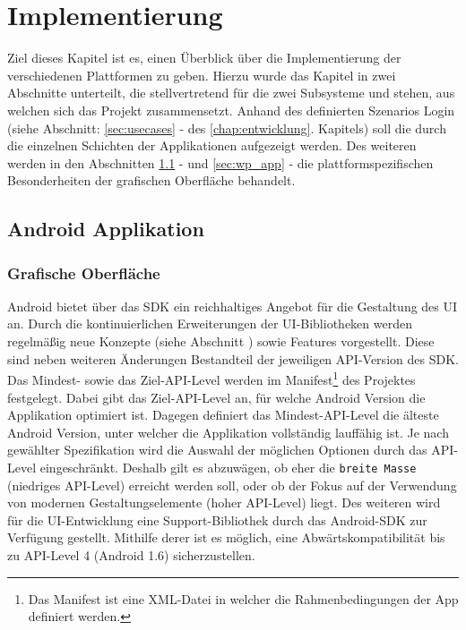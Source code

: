 \documentclass[Bachelorarbeit.tex]{subfiles}
\begin{document}
\chapter{Implementierung}
\label{chap:implementierung}

Ziel dieses Kapitel ist es, einen Überblick über die Implementierung der verschiedenen Plattformen zu geben.
Hierzu wurde das Kapitel in zwei Abschnitte unterteilt, die stellvertretend für die zwei Subsysteme  und  stehen, aus welchen sich das Projekt zusammensetzt.
Anhand des definierten Szenarios Login (siehe Abschnitt: \ref{sec:usecases} -  des \ref{chap:entwicklung}. Kapitels) soll die  durch die einzelnen Schichten der Applikationen aufgezeigt werden.
Des weiteren werden in den Abschnitten \ref{sec:android_app} -  und \ref{sec:wp_app} -  die plattformspezifischen Besonderheiten der grafischen Oberfläche behandelt.


\section{Android Applikation}
\label{sec:android_app}

\subsection*{Grafische Oberfläche}
Android bietet über das \ac{SDK} ein reichhaltiges Angebot für die Gestaltung des \ac{UI} an.
Durch die kontinuierlichen Erweiterungen der \ac{UI}-Bibliotheken werden regelmäßig neue Konzepte (siehe Abschnitt ) sowie Features vorgestellt.
Diese sind neben weiteren Änderungen Bestandteil der jeweiligen \ac{API}-Version des \ac{SDK}.
Das Mindest- sowie das Ziel-\ac{API}-Level werden im Manifest\footnote{Das Manifest ist eine \ac{XML}-Datei in welcher die Rahmenbedingungen der App definiert werden.} des Projektes festgelegt. 
Dabei gibt das Ziel-\ac{API}-Level an, für welche Android Version die Applikation optimiert ist. 
Dagegen definiert das Mindest-\ac{API}-Level die älteste Android Version, unter welcher die Applikation vollständig lauffähig ist.
Je nach gewählter Spezifikation wird die Auswahl der möglichen Optionen durch das \ac{API}-Level eingeschränkt. 
Deshalb gilt es abzuwägen, ob eher die \texttt{breite Masse} (niedriges \ac{API}-Level) erreicht werden soll, oder ob der Fokus auf der Verwendung von modernen Gestaltungselemente (hoher \ac{API}-Level) liegt.
Des weiteren wird für die \ac{UI}-Entwicklung eine Support-Bibliothek durch das Android-\ac{SDK} zur Verfügung gestellt. 
Mithilfe derer ist es möglich, eine Abwärtskompatibilität bis zu  \ac{API}-Level 4 (Android 1.6) sicherzustellen. \parencite[vgl.:][]{android_supportLib}\\
\end{document}
